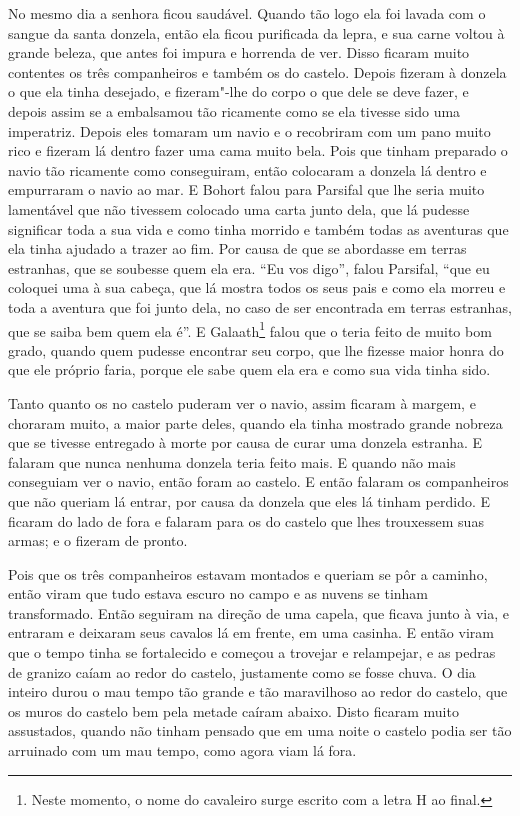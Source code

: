 No mesmo dia a senhora ficou saudável. Quando tão logo ela foi lavada com o
sangue da santa donzela, então ela ficou purificada da lepra, e sua carne
voltou à grande beleza, que antes foi impura e horrenda de ver. Disso ficaram
muito contentes os três companheiros e também os do castelo. Depois fizeram à
donzela o que ela tinha desejado, e fizeram"-lhe do corpo o que dele se deve
fazer, e depois assim se a embalsamou tão ricamente como se ela tivesse sido
uma imperatriz. Depois eles tomaram um navio e o recobriram com um pano muito
rico e fizeram lá dentro fazer uma cama muito bela. Pois que tinham preparado o
navio tão ricamente como conseguiram, então colocaram a donzela lá dentro e
empurraram o navio ao mar. E Bohort falou para Parsifal que lhe seria muito
lamentável que não tivessem colocado uma carta junto dela, que lá pudesse
significar toda a sua vida e como tinha morrido e também todas as aventuras que
ela tinha ajudado a trazer ao fim. Por causa de que se abordasse em terras
estranhas, que se soubesse quem ela era. “Eu vos digo”, falou Parsifal, “que
eu coloquei uma à sua cabeça, que lá mostra todos os seus pais e como ela
morreu e toda a aventura que foi junto dela, no caso de ser encontrada em
terras estranhas, que se saiba bem quem ela é”. E Galaath\footnote{ Neste
momento, o nome do cavaleiro surge escrito com a letra H ao final. 
} falou que o teria feito de muito bom grado, quando quem pudesse encontrar seu
corpo, que lhe fizesse maior honra do que ele próprio faria, porque ele sabe
quem ela era e como sua vida tinha sido.

Tanto quanto os no castelo puderam ver o navio, assim ficaram à margem, e
choraram muito, a maior parte deles, quando ela tinha mostrado grande nobreza
que se tivesse entregado à morte por causa de curar uma donzela estranha. E
falaram que nunca nenhuma donzela teria feito mais. E quando não mais
conseguiam ver o navio, então foram ao castelo. E então falaram os
companheiros que não queriam lá entrar, por causa da donzela que eles lá
tinham perdido. E ficaram do lado de fora e falaram para os do castelo que lhes
trouxessem suas armas; e o fizeram de pronto. 

Pois que os três companheiros estavam montados e queriam se pôr a caminho, então
viram que tudo estava escuro no campo e as nuvens se tinham transformado. Então
seguiram na direção de uma capela, que ficava junto à via, e entraram e
deixaram seus cavalos lá em frente, em uma casinha. E então viram que o tempo
tinha se fortalecido e começou a trovejar e relampejar, e as pedras de granizo
caíam ao redor do castelo, justamente como se fosse chuva. O dia inteiro durou
o mau tempo tão grande e tão maravilhoso ao redor do castelo, que os muros do
castelo bem pela metade caíram abaixo. Disto ficaram muito assustados, quando
não tinham pensado que em uma noite o castelo podia ser tão arruinado com um
mau tempo, como agora viam lá fora.

